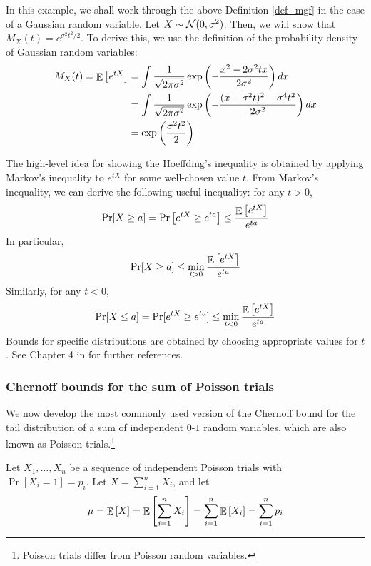 \begin{example}
    In this example, we shall work through the above Definition \ref{def_mgf} in the case of a Gaussian random variable.
    Let $X \sim \mathcal{N}(0, \sigma^2)$. Then, we will show that $M_X(t) = e^{\sigma^2 t^2 / 2}$.
    To derive this, we use the definition of the probability density of Gaussian random variables:
    \begin{align*}
        M_X(t) = \mathop{\mathbb{E}}\left[ e^{tX} \right] &= \int \frac 1 {\sqrt{2\pi\sigma^2}} \exp\left( - \frac {x^2 - 2\sigma^2 tx} {2\sigma^2} \right) dx \\
        &= \int \frac 1 {\sqrt{2 \pi\sigma^2}} \exp\left(- \frac {(x - \sigma^2 t)^2 - \sigma^4 t^2} {2\sigma^2} \right) dx \\
        &= \exp\left( \frac {\sigma^2 t^2} 2 \right)
    \end{align*}
\end{example}

The high-level idea for showing the Hoeffding's inequality is obtained by applying Markov's inequality to $e^{tX}$ for some well-chosen value $t$.
From Markov's inequality, we can derive the following useful inequality: for any $t > 0$,
\[ \Pr[X \ge a] = \Pr\left[e^{tX} \ge e^{ta}\right] \le \frac {\mathop{\mathbb{E}}\left[ e^{tX} \right]} {e^{ta}}  \]
In particular,
\begin{align} \Pr[X \ge a] \le \min_{t > 0} \frac {\mathop{\mathbb{E}}\left[ e^{tX} \right]} {e^{ta}} \label{eq_tail_pos} \end{align}
Similarly, for any $t < 0$,
\[ \Pr[X \le a] = \Pr[e^{tX} \ge e^{ta}] \le \min_{t < 0} \frac {\mathop{\mathbb{E}}\left[ e^{tX} \right]} {e^{ta}} \]
Bounds for specific distributions are obtained by choosing appropriate values for $t$.
See Chapter 4 in \cite{mitzenmacher2017probability} for further references.

\subsubsection{Chernoff bounds for the sum of Poisson trials}

We now develop the most commonly used version of the Chernoff bound for the tail distribution of a sum of independent $0$-$1$ random variables, which are also known as Poisson trials.\footnote{Poisson trials differ from Poisson random variables.}

Let $X_1, \dots, X_n$ be a sequence of independent Poisson trials with $\Pr[X_i = 1] = p_i$.
Let $X = \sum_{i=1}^n X_i$, and let
\[ \mu = \mathop{\mathbb{E}}\left[ X \right] = \mathop{\mathbb{E}}\left[ \sum_{i=1}^n X_i \right] = \sum_{i=1}^n \mathop{\mathbb{E}}\left[ X_i \right] = \sum_{i=1}^n p_i \]

